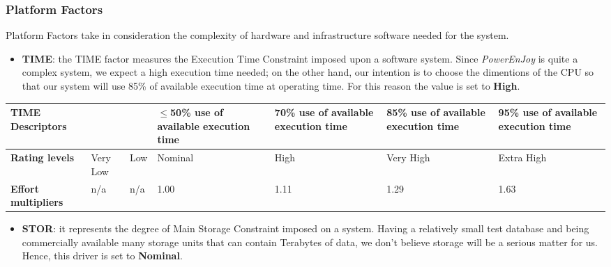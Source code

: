	
	
	\subsubsection*{Platform Factors}
	Platform Factors take in consideration the complexity of hardware and infrastructure software needed for the system. 
	
	
		\begin{itemize}
			\item \textbf{TIME}: the TIME factor measures the Execution Time Constraint imposed upon a software system. Since \textit{PowerEnJoy} is quite a complex system, we expect a high execution time needed; on the other hand, our intention is to choose the dimentions of the CPU so that our system will use 85\% of available execution time at operating time. For this reason the value is set to \textbf{High}.
		\end{itemize}
		
		\begin{center}
			\begin{tabular}{ | C{2cm} | C{2cm} | C{2cm} | C{2cm} | C{2cm} | C{2cm} | C{2cm} | }
				\hline
				\textbf{TIME Descriptors} & & & $\leq$50\% use of available execution time & 70\% use of available execution time & 85\% use of available execution time & 95\% use of available execution time\\ \hline
			
				\textbf{Rating levels} & Very Low & Low & Nominal & High & Very High & Extra High\\ \hline
			
				\textbf{Effort multipliers} & n/a & n/a & 1.00 & 1.11 & 1.29 & 1.63\\ \hline
			\end{tabular}
		\end{center}
		
		
		
		
		\begin{itemize}
			\item \textbf{STOR}: it represents the degree of Main Storage Constraint imposed on a system. Having a relatively small test database and being commercially available many storage units that can contain Terabytes of data, we don't believe storage will be a serious matter for us. Hence, this driver is set to \textbf{Nominal}.
		\end{itemize}
		
